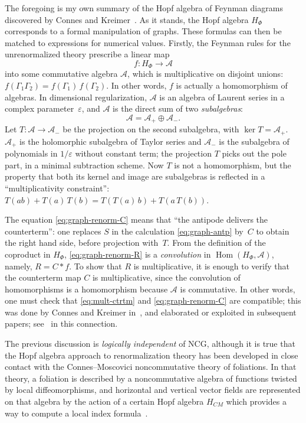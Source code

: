 \documentclass[a4paper,12pt]{article}
\newcommand{\A}{\mathcal{A}}        %
\newcommand{\eps}{\varepsilon}      %
\newcommand{\Ga}{\Gamma}            %
\DeclareMathOperator{\Hom}{Hom}     %
\newcommand{\1}{\mathbf{1}}         %
\newcommand{\7}{\dagger}            %
\newcommand{\8}{\bullet}            %
\renewcommand{\.}{\cdot}            %
\renewcommand{\:}{\colon}           %
\begin{document}
The foregoing is my own summary of the Hopf algebra of Feynman
diagrams discovered by Connes and
Kreimer~\cite{ConnesKrRHI,ConnesKrRHII}. As it stands, the Hopf
algebra $H_\Phi$ corresponds to a formal manipulation of graphs. These
formulas can then be matched to expressions for numerical values.
Firstly, the Feynman rules for the unrenormalized theory prescribe a
linear map
$$
f : H_\Phi \to \A
$$
into some commutative algebra $\A$, which is multiplicative on
disjoint unions: $f(\Ga_1 \Ga_2) = f(\Ga_1)\,f(\Ga_2)$. In other
words, $f$ is actually a homomorphism of algebras. In dimensional
regularization, $\A$ is an algebra of Laurent series in a complex
parameter~$\eps$, and $\A$ is the direct sum of two
\textit{subalgebras}:
$$
\A = \A_+ \oplus \A_-.
$$
Let $T\: \A \to \A_-$ be the projection on the second subalgebra, with
$\ker T = \A_+$. $\A_+$ is the holomorphic subalgebra of Taylor series
and $\A_-$ is the subalgebra of polynomials in $1/\eps$ without
constant term; the projection $T$ picks out the pole part, in a
minimal subtraction scheme. Now $T$ is not a homomorphism, but the
property that both its kernel and image are subalgebras is reflected
in a ``multiplicativity constraint'':
$T(ab) + T(a)\,T(b) = T(T(a)\,b) + T(a\,T(b))$.

The equation \eqref{eq:graph-renorm-C} means that ``the antipode
delivers the counterterm'': one replaces $S$ in the calculation
\eqref{eq:graph-antp} by~$C$ to obtain the right hand side, before
projection with~$T$. From the definition of the coproduct in $H_\Phi$,
\eqref{eq:graph-renorm-R} is a \textit{convolution} in
$\Hom(H_\Phi,\A)$, namely, $R = C * f$. To show that $R$ is
multiplicative, it is enough to verify that the counterterm map $C$ is
multiplicative, since the convolution of homomorphisms is a
homomorphism because $\A$ is commutative. In other words, one must
check that \eqref{eq:mult-ctrtm} and \eqref{eq:graph-renorm-C} are
compatible; this was done by Connes and Kreimer in~\cite{ConnesKrRHI},
and elaborated or exploited in subsequent papers; see~\cite{GirelliMK}
in this connection.

The previous discussion is \textit{logically independent} of NCG,
although it is true that the Hopf algebra approach to renormalization
theory has been developed in close contact with the Connes--Moscovici
noncommutative theory of foliations. In that theory, a foliation is
described by a noncommutative algebra of functions twisted by local
diffeomorphisms, and horizontal and vertical vector fields are
represented on that algebra by the action of a certain Hopf algebra
$H_{CM}$ which provides a way to compute a local index
formula~\cite{ConnesMHopf}.
\end{document}
